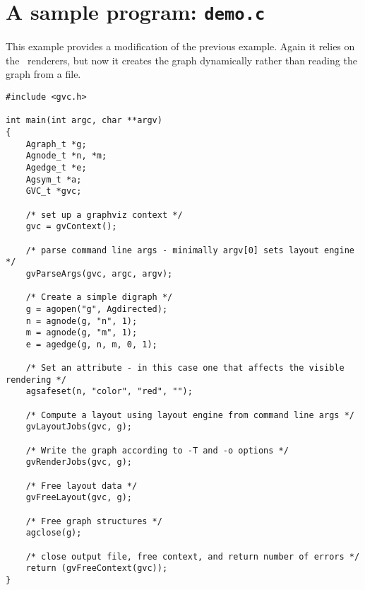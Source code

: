 \section{A sample program: {\tt demo.c}}
\label{sec:demo}
This example provides a modification of the previous example. Again it
relies on the \gviz\ renderers, but now it creates the graph dynamically
rather than reading the graph from a file.   
\begin{verbatim}
#include <gvc.h>

int main(int argc, char **argv)
{
    Agraph_t *g;
    Agnode_t *n, *m;
    Agedge_t *e;
    Agsym_t *a;
    GVC_t *gvc;

    /* set up a graphviz context */
    gvc = gvContext();

    /* parse command line args - minimally argv[0] sets layout engine */
    gvParseArgs(gvc, argc, argv);

    /* Create a simple digraph */
    g = agopen("g", Agdirected);
    n = agnode(g, "n", 1);
    m = agnode(g, "m", 1);
    e = agedge(g, n, m, 0, 1);

    /* Set an attribute - in this case one that affects the visible rendering */
    agsafeset(n, "color", "red", "");

    /* Compute a layout using layout engine from command line args */
    gvLayoutJobs(gvc, g);

    /* Write the graph according to -T and -o options */
    gvRenderJobs(gvc, g);

    /* Free layout data */
    gvFreeLayout(gvc, g);

    /* Free graph structures */
    agclose(g);

    /* close output file, free context, and return number of errors */
    return (gvFreeContext(gvc));
}
\end{verbatim}
